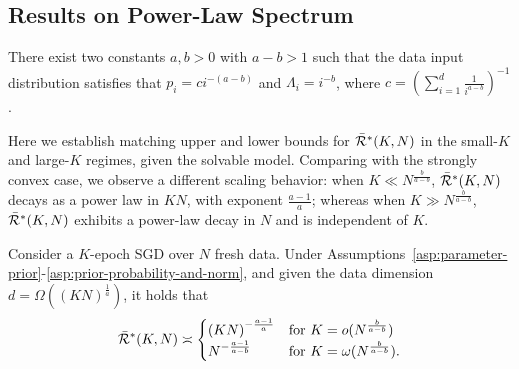 \subsection{Results on Power-Law Spectrum}\label{sec:power-spectrum}
\begin{assumption} \label{asp:prior-probability-and-norm}
    There exist two constants $a,b> 0$ with $a-b>1$ such that the data input distribution satisfies that $p_i = c i^{-(a-b)}$ and $\Lambda_i = i^{-b}$, where $c = \left(\sum_{i=1}^d \frac{1}{i^{a-b}}\right)^{-1}$.
\end{assumption}
Here we establish matching upper and lower bounds for $\Bar{\mathcal{R}}^*(K,N)$ in the small-$K$ and large-$K$ regimes, given the solvable model. Comparing with the strongly convex case, we observe a different scaling behavior: when $K \ll N^{\tfrac{b}{a-b}}$, $\Bar{\mathcal{R}}^*(K,N)$ decays as a power law in $KN$, with exponent $\tfrac{a-1}{a}$;
whereas when $K \gg N^{\tfrac{b}{a-b}}$, $\Bar{\mathcal{R}}^*(K,N)$ exhibits a power-law decay in $N$ and is independent of $K$.
\begin{theorem} \label{thm:one-hot-scaling-law}
    Consider a $K$-epoch SGD over $N$ fresh data. Under Assumptions~\ref{asp:parameter-prior}-\ref{asp:prior-probability-and-norm}, and given the data dimension $d = \Omega((KN)^{\frac{1}{a}})$, it holds that
    \[
    \Bar{\mathcal{R}}^*(K,N) \asymp 
    \begin{cases}
         \left(KN\right)^{-\frac{a-1}{a}} & \text{for } K = o(N^{\frac{b}{a-b}}) \\
         N^{-\frac{a-1}{a-b}} & \text{for } K = \omega(N^{\frac{b}{a-b}}).
    \end{cases}
    \]
\end{theorem}

